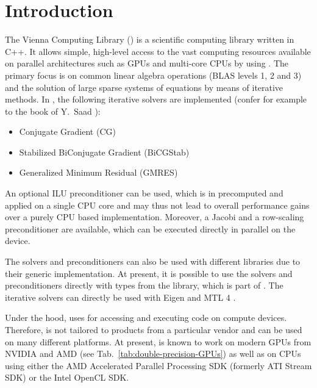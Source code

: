 
\chapter*{Introduction}   

The Vienna Computing Library (\ViennaCL) is a scientific computing
library written in C++. It allows simple, high-level access
to the vast computing resources available on parallel architectures such as
GPUs and multi-core CPUs by using {\OpenCL}. The primary focus is on common linear algebra
operations (BLAS levels 1, 2 and 3) and the solution of large sparse systems of equations by means of iterative
methods. In {\ViennaCLminorversion}, the following iterative solvers are
implemented (confer for example to the book of Y.~Saad \cite{saad-iterative-solution}):
\begin{itemize}
 \item Conjugate Gradient (CG)
 \item Stabilized BiConjugate Gradient (BiCGStab)
 \item Generalized Minimum Residual (GMRES)
\end{itemize}
An optional ILU preconditioner can be used, which is in {\ViennaCLversion}
precomputed and applied on a single CPU core and may thus not lead to overall
performance gains over a purely CPU based implementation.
Moreover, a Jacobi and a row-scaling preconditioner are available, which can be executed directly in parallel on the {\OpenCL} device.

The solvers and preconditioners can also be used with different
libraries due to their generic implementation. At present, it is possible to
use the solvers and preconditioners directly with types from the {\ublas} library, which is part of 
{\Boost} \cite{boost}. The iterative solvers can directly be used with Eigen \cite{eigen} and MTL 4 \cite{mtl4}.

Under the hood, {\ViennaCL} uses {\OpenCL} \cite{khronoscl} for accessing and
executing code on compute devices. Therefore, {\ViennaCL} is not tailored 
to products from a particular vendor and can be used on many different
platforms. At present, {\ViennaCL} is known to work on modern GPUs from {NVIDIA}
and AMD (see Tab.~\ref{tab:double-precision-GPUs}) as well as on CPUs 
using either the AMD Accelerated Parallel Processing SDK (formerly ATI Stream SDK) or the Intel OpenCL SDK.


